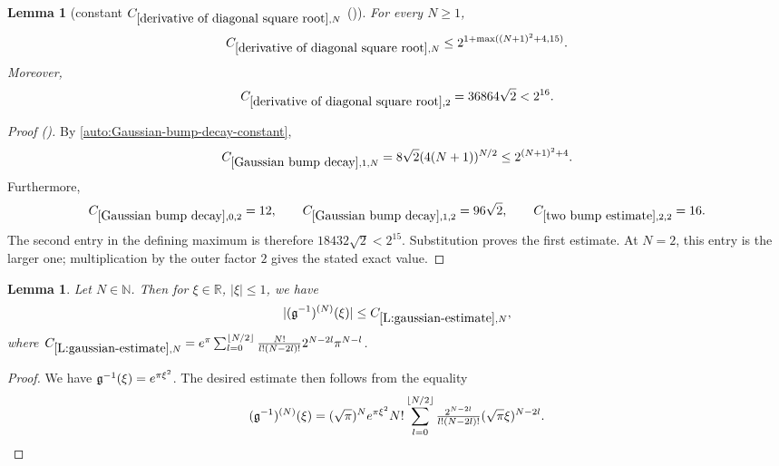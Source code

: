 \documentclass[12pt,reqno]{amsart}
\newcommand{\auto}{{({\tiny\faCar})}}
\theoremstyle{plain}
\newtheorem{lemma}[theorem]{Lemma}
\numberwithin{equation}{section}
\theoremstyle{remark}
\newcommand{\uses}[1]{}
\newcommand{\usesdefs}[1]{}
\newcommand{\R}{{\mathbb R}}
\newcommand{\N}{{\mathbb N}}
\begin{document}
\begin{lemma}[constant $C_{\ref{derivative of diagonal square root},N}$ \auto]\label{constant derivative diagonal square root}\uses{Gaussian bump decay,two bump estimate,derivative of diagonal square root}\usesdefs{}
For every $N\ge1$,
\begin{equation}\label{constant derivative diagonal square root bound}
C_{\ref{derivative of diagonal square root},N}
\le2^{1+\max((N+1)^2+4,15)}.
\end{equation}
Moreover,
\begin{equation}\label{auto:constant-derivative-diagonal-square-root-two}
C_{\ref{derivative of diagonal square root},2}=36864\sqrt2<2^{16}.
\end{equation}
\end{lemma}
\begin{proof}[Proof \auto]
By \eqref{auto:Gaussian-bump-decay-constant},
\[
C_{\ref{Gaussian bump decay},1,N}
=8\sqrt2(4(N+1))^{N/2}
\le2^{(N+1)^2+4}.
\]
Furthermore,
\[
C_{\ref{Gaussian bump decay},0,2}=12,
\qquad
C_{\ref{Gaussian bump decay},1,2}=96\sqrt2,
\qquad
C_{\ref{two bump estimate},2,2}=16.
\]
The second entry in the defining maximum is therefore $18432\sqrt2<2^{15}$. Substitution proves the first estimate. At $N=2$, this entry is the larger one; multiplication by the outer factor $2$ gives the stated exact value.
\end{proof}


\begin{lemma}\label{L:gaussian-estimate}\uses{}\usesdefs{gaussian}
Let $N\in \N$. Then for $\xi \in \R$, $|\xi|\leq 1$, we have
\begin{equation}\label{auto:inverse-Gaussian-derivative-bound}
|(\mathfrak{g}^{-1})^{(N)}(\xi)| \leq C_{\ref{L:gaussian-estimate},N},
\end{equation}
where $C_{\ref{L:gaussian-estimate},N}=e^{\pi} \sum_{l=0}^{\lfloor N/2 \rfloor} \frac{N!}{l!(N-2l)!} 2^{N-2l} \pi^{N-l}$.
\end{lemma}

\begin{proof}
We have $\mathfrak{g}^{-1}(\xi)=e^{\pi\xi^2}$. The desired estimate then follows from the equality
\[
(\mathfrak{g}^{-1})^{(N)}(\xi)
=(\sqrt{\pi})^{N} e^{\pi  \xi^2} N!\sum_{l=0}^{\lfloor N/2\rfloor} \tfrac{2^{N-2l}}{l!(N -2l)!} (\sqrt{\pi} \xi)^{N-2l}.
\]
\end{proof}
\end{document}
